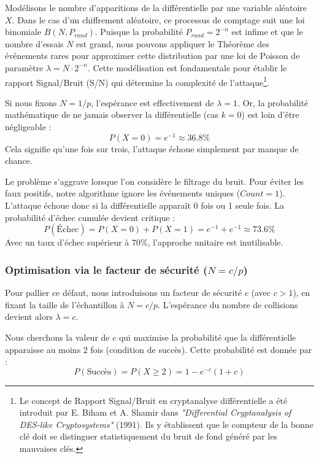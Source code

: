 \documentclass{article}
\begin{document}
    Modélisons le nombre d'apparitions de la différentielle par une variable aléatoire $X$. Dans le cas d'un chiffrement aléatoire, ce processus de comptage suit une loi binomiale $B(N, P_{rand})$.
    Puisque la probabilité $P_{rand} = 2^{-n}$ est infime et que le nombre d'essais $N$ est grand, nous pouvons appliquer le Théorème des événements rares pour approximer cette distribution par une loi de Poisson de paramètre $\lambda = N \cdot 2^{-n}$.
    Cette modélisation est fondamentale pour établir le rapport Signal/Bruit (S/N) qui détermine la complexité de l'attaque\footnote{Le concept de Rapport Signal/Bruit en cryptanalyse différentielle a été introduit par E. Biham et A. Shamir dans \textit{"Differential Cryptanalysis of DES-like Cryptosystems"} (1991). Ils y établissent que le compteur de la bonne clé doit se distinguer statistiquement du bruit de fond généré par les mauvaises clés.}.

    Si nous fixons $N=1/p$, l'espérance est effectivement de $\lambda = 1$. Or, la probabilité mathématique de ne jamais observer la différentielle (cas $k=0$) est loin d'être négligeable :
    $$P(X = 0) = e^{-1} \approx 36.8\%$$
    Cela signifie qu'une fois sur trois, l'attaque échoue simplement par manque de chance.

    Le problème s'aggrave lorsque l'on considère le filtrage du bruit. Pour éviter les faux positifs, notre algorithme ignore les événements uniques ($Count=1$). L'attaque échoue donc si la différentielle apparaît 0 fois ou 1 seule fois. La probabilité d'échec cumulée devient critique :
    $$P(\text{Échec}) = P(X=0) + P(X=1) = e^{-1} + e^{-1} \approx 73.6\%$$
    Avec un taux d'échec supérieur à 70\%, l'approche unitaire est inutilisable.



    \subsubsection{Optimisation via le facteur de sécurité ($N=c/p$)}

    Pour pallier ce défaut, nous introduisons un facteur de sécurité $c$ (avec $c > 1$), en fixant la taille de l'échantillon à $N = c/p$. L'espérance du nombre de collisions devient alors $\lambda = c$.

    Nous cherchons la valeur de $c$ qui maximise la probabilité que la différentielle apparaisse au moins 2 fois (condition de succès). Cette probabilité est donnée par :
    $$ P(\text{Succès}) = P(X \ge 2) = 1 - e^{-c}(1 + c) $$
\end{document}
